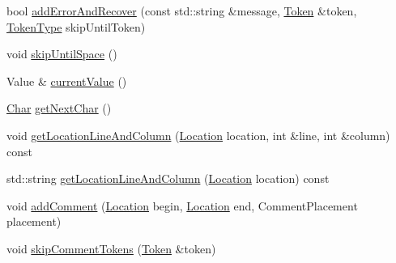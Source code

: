 \begin{DoxyCompactItemize}
\item 
bool \hyperlink{class_json_1_1_our_reader_ae68a7047acd692be8077e259d524c6d9}{add\+Error\+And\+Recover} (const std\+::string \&message, \hyperlink{class_json_1_1_our_reader_1_1_token}{Token} \&token, \hyperlink{class_json_1_1_our_reader_a15116f7276ddf1e7a2cc3cbefa884dcc}{Token\+Type} skip\+Until\+Token)
\item 
void \hyperlink{class_json_1_1_our_reader_ad48bdaf5b686706f003e792fdbcbf102}{skip\+Until\+Space} ()
\item 
Value \& \hyperlink{class_json_1_1_our_reader_a2acd5b1d53e7d7e17c21ff8e96edc09d}{current\+Value} ()
\item 
\hyperlink{class_json_1_1_our_reader_a0cd0bab4caa66594ab843ccd5f9dc239}{Char} \hyperlink{class_json_1_1_our_reader_a298285d035fdbc554caae09d9f0a5859}{get\+Next\+Char} ()
\item 
void \hyperlink{class_json_1_1_our_reader_a9f47ad324225df1e68bda7dc451845c9}{get\+Location\+Line\+And\+Column} (\hyperlink{class_json_1_1_our_reader_a1bdc7bbc52ba87cae6b19746f2ee0189}{Location} location, int \&line, int \&column) const 
\item 
std\+::string \hyperlink{class_json_1_1_our_reader_a579a7d2e493f63c4b122103844e3cedd}{get\+Location\+Line\+And\+Column} (\hyperlink{class_json_1_1_our_reader_a1bdc7bbc52ba87cae6b19746f2ee0189}{Location} location) const 
\item 
void \hyperlink{class_json_1_1_our_reader_ad7318c37469a9106069a236fb4b10e1f}{add\+Comment} (\hyperlink{class_json_1_1_our_reader_a1bdc7bbc52ba87cae6b19746f2ee0189}{Location} begin, \hyperlink{class_json_1_1_our_reader_a1bdc7bbc52ba87cae6b19746f2ee0189}{Location} end, Comment\+Placement placement)
\item 
void \hyperlink{class_json_1_1_our_reader_a856dea44d92578c276856d7a65a4ebdc}{skip\+Comment\+Tokens} (\hyperlink{class_json_1_1_our_reader_1_1_token}{Token} \&token)
\end{DoxyCompactItemize}

